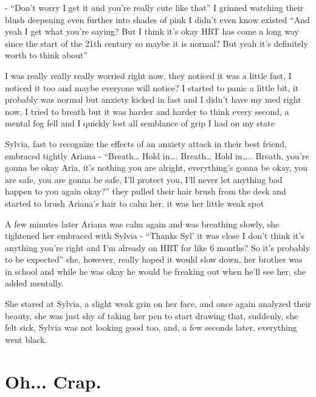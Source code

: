 \documentclass[hidelinks,12pt,a4paper]{book}
\begin{document}
- “Don't worry I get it and you're really cute like that” 
I grinned watching their blush deepening even further into shades of pink I didn't even know existed
“And yeah I get what you're saying? But I think it's okay HRT has come a 
long way since the start of the 21th century so maybe it is normal? But yeah it's definitely worth to think about”\par
\bigskip

I was really really really worried right now, 
they noticed it was a little fast, I noticed it too and maybe everyone will notice? 
I started to panic a little bit, it probably was normal but anxiety kicked in fast and I didn't have my med right now,
 I tried to breath but it was harder and harder to think every second, a mental fog fell and I quickly lost all
semblance of grip I had on my state\par
\bigskip

Sylvia, fast to recognize the effects of an anxiety attack in their best friend, embraced tightly Ariana\newline
- “Breath… Hold in…. Breath… Hold in….. Breath, you're gonna be okay Aria, 
it's nothing you are alright, everything's gonna be okay, you are safe, you are gonna be safe, I'll protect you, 
I'll never let anything bad happen to you again okay?” they pulled their hair brush from the desk and started to 
brush Ariana's hair to calm her, it was her little weak spot\par
\bigskip

A few minutes later Ariana was calm again and was breathing slowly, she tightened her embraced with Sylvia\newline
- “Thanks Syl' it was close I don't think it's anything you're right and I'm already on HRT for like 
6 months? So it's probably to be expected” she, however, really hoped it would slow down, her brother 
was in school and while he was okay he would be freaking out when he'll see her, she added mentally.\par
\bigskip

She stared at Sylvia, a slight weak grin on her face, and once again analyzed their beauty,
 she was just shy of taking her pen to start drawing that, suddenly, she felt sick,
Sylvia was not looking good too, and, a few seconds later, everything went black.


\chapter{Oh... Crap.}
\end{document}
